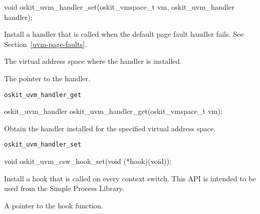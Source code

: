 \begin{apisyn}

        \funcproto void         oskit_uvm_handler_set(oskit_vmspace_t vm,
                                      oskit_uvm_handler handler);
\end{apisyn}
\begin{apidesc}
Install a handler that is called when the default page fault handler
fails.  See Section~\ref{uvm-page-faults}.
\end{apidesc}
\begin{apiparm}
        \item[vm]
                The virtual address space where the handler is installed.
        \item[handler]
                The pointer to the handler.
\end{apiparm}
\begin{apirel}
        {\tt oskit_uvm_handler_get}
\end{apirel}
\begin{apisyn}

        \funcproto oskit_uvm_handler    oskit_uvm_handler_get(oskit_vmspace_t vm);
\end{apisyn}
\begin{apidesc}
        Obtain the handler installed for the specified virtual address space.
\end{apidesc}
\begin{apirel}
        {\tt oskit_uvm_handler_set}
\end{apirel}

\begin{apisyn}

        \funcproto void         oskit_uvm_csw_hook_set(void (*hook)(void));
\end{apisyn}
\begin{apidesc}
        Install a hook that is called on every context switch.  This API is
        intended to be used from the Simple Process Library.
\end{apidesc}
\begin{apiparm}
        \item[hook]     
                A pointer to the hook function.
\end{apiparm}
